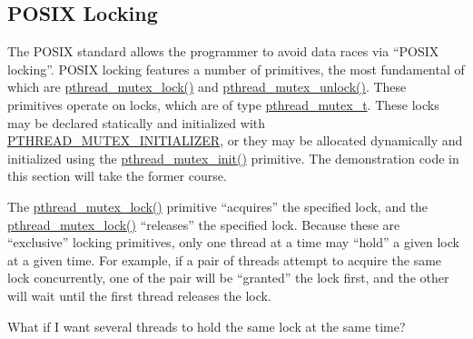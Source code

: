 \subsection{POSIX Locking}
\label{sec:toolsoftrade:POSIX Locking}

The POSIX standard allows the programmer to avoid data races via
``POSIX locking''.
POSIX locking features a number of primitives, the most fundamental
of which are \url{pthread_mutex_lock()} and \url{pthread_mutex_unlock()}.
These primitives operate on locks, which are of type \url{pthread_mutex_t}.
These locks may be declared statically and initialized with
\url{PTHREAD_MUTEX_INITIALIZER}, or they may be allocated dynamically
and initialized using the \url{pthread_mutex_init()} primitive.
The demonstration code in this section will take the former course.

The \url{pthread_mutex_lock()} primitive ``acquires'' the specified lock,
and the \url{pthread_mutex_lock()} ``releases'' the specified lock.
Because these are ``exclusive'' locking primitives,
only one thread at a time may ``hold'' a given lock at a given time.
For example, if a pair of threads attempt to acquire the same lock
concurrently, one of the pair will be ``granted'' the lock first, and
the other will wait until the first thread releases the lock.

\QuickQuiz{}
	What if I want several threads to hold the same lock at the
	same time?
 \QuickQuizEnd

